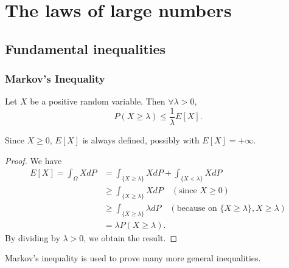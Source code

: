 \chapter{The laws of large numbers}%
\sloppy%
\section{Fundamental inequalities}%
\subsection{Markov's Inequality}%
\begin{proposition}
Let $X$ be a positive random variable. Then $\forall \lambda > 0$,
\[
P(X \ge \lambda) \le \frac{1}{\lambda} E[X].
\]
\end{proposition}%
\begin{remark}
Since $X \ge 0$, $E[X]$ is always defined, possibly with $E[X] = +\infty$.
\end{remark}%
\begin{proof}
We have
\begin{align*}
E[X] = \int_{\Omega} X dP &= \int_{\{X \ge \lambda\}} X dP + \int_{\{X < \lambda\}} X dP \\
&\ge \int_{\{X \ge \lambda\}} X dP \quad (\text{since } X \ge 0) \\
&\ge \int_{\{X \ge \lambda\}} \lambda dP \quad (\text{because on } \{X \ge \lambda\}, X \ge \lambda) \\
&= \lambda P(X \ge \lambda).
\end{align*}
By dividing by $\lambda > 0$, we obtain the result.
\end{proof}%
Markov's inequality is used to prove many more general inequalities.%
